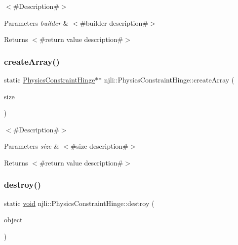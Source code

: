 $<$\#\+Description\#$>$


\begin{DoxyParams}{Parameters}
{\em builder} & $<$\#builder description\#$>$\\
\hline
\end{DoxyParams}
\begin{DoxyReturn}{Returns}
$<$\#return value description\#$>$ 
\end{DoxyReturn}
\mbox{\label{classnjli_1_1_physics_constraint_hinge_a26086ec7b819cb9f77875926367e65bf}} 
\subsubsection{\texorpdfstring{create\+Array()}{createArray()}}
{\footnotesize\ttfamily static \mbox{\hyperlink{classnjli_1_1_physics_constraint_hinge}{Physics\+Constraint\+Hinge}}$\ast$$\ast$ njli\+::\+Physics\+Constraint\+Hinge\+::create\+Array (\begin{DoxyParamCaption}\item[{const \mbox{\hyperlink{_util_8h_a10e94b422ef0c20dcdec20d31a1f5049}{u32}}}]{size }\end{DoxyParamCaption})\hspace{0.3cm}{\ttfamily [static]}}

$<$\#\+Description\#$>$


\begin{DoxyParams}{Parameters}
{\em size} & $<$\#size description\#$>$\\
\hline
\end{DoxyParams}
\begin{DoxyReturn}{Returns}
$<$\#return value description\#$>$ 
\end{DoxyReturn}
\mbox{\label{classnjli_1_1_physics_constraint_hinge_adb8534e0d1b950006347ed71ae652d87}} 
\subsubsection{\texorpdfstring{destroy()}{destroy()}}
{\footnotesize\ttfamily static \mbox{\hyperlink{_thread_8h_af1e856da2e658414cb2456cb6f7ebc66}{void}} njli\+::\+Physics\+Constraint\+Hinge\+::destroy (\begin{DoxyParamCaption}\item[{\mbox{\hyperlink{classnjli_1_1_physics_constraint_hinge}{Physics\+Constraint\+Hinge}} $\ast$}]{object }\end{DoxyParamCaption})\hspace{0.3cm}{\ttfamily [static]}}

